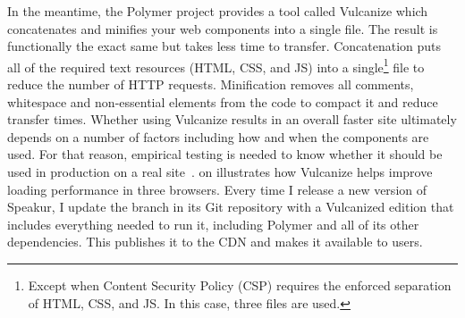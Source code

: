 In the meantime, the Polymer project provides a tool called Vulcanize which concatenates and minifies your web components into a single file.
The result is functionally the exact same but takes less time to transfer.
Concatenation puts all of the required text resources (HTML, CSS, and JS) into a 
single\footnote{Except when Content Security Policy (CSP) requires the enforced separation of HTML, CSS, and JS. In this case, three files are used.}
file to reduce the number of HTTP requests.
Minification removes all comments, whitespace and non-essential elements from the code to compact it and reduce transfer times.
Whether using Vulcanize results in an overall faster site ultimately depends on a number of factors including how and when the components are used.
For that reason, empirical testing is needed to know whether it should be used in production on a real site~\cite{polymercontributors2015-a}.
 on  illustrates how Vulcanize helps improve loading performance in three browsers.
Every time I release a new version of Speakur, I update the  branch in its Git repository with a Vulcanized edition that includes everything needed to run it, including Polymer and all of its other dependencies.
This publishes it to the  CDN and makes it available to users.
